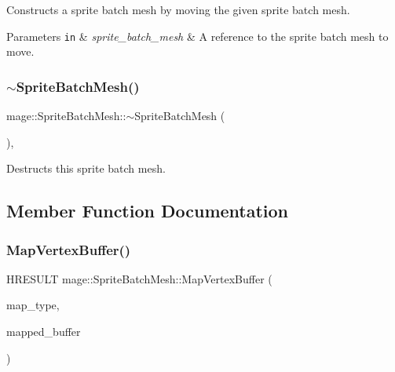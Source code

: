 Constructs a sprite batch mesh by moving the given sprite batch mesh.


\begin{DoxyParams}[1]{Parameters}
\mbox{\tt in}  & {\em sprite\+\_\+batch\+\_\+mesh} & A reference to the sprite batch mesh to move. \\
\hline
\end{DoxyParams}
\hypertarget{classmage_1_1_sprite_batch_mesh_a4f9ad5d0d58722499b9e7ddfac3312c9}{}\label{classmage_1_1_sprite_batch_mesh_a4f9ad5d0d58722499b9e7ddfac3312c9} 
\subsubsection{\texorpdfstring{$\sim$\+Sprite\+Batch\+Mesh()}{~SpriteBatchMesh()}}
{\footnotesize\ttfamily mage\+::\+Sprite\+Batch\+Mesh\+::$\sim$\+Sprite\+Batch\+Mesh (\begin{DoxyParamCaption}{ }\end{DoxyParamCaption})\hspace{0.3cm}{\ttfamily [virtual]}, {\ttfamily [default]}}

Destructs this sprite batch mesh. 

\subsection{Member Function Documentation}
\hypertarget{classmage_1_1_sprite_batch_mesh_ab790dbbd3cb685c1f14d7ca1e9ed639b}{}\label{classmage_1_1_sprite_batch_mesh_ab790dbbd3cb685c1f14d7ca1e9ed639b} 
\subsubsection{\texorpdfstring{Map\+Vertex\+Buffer()}{MapVertexBuffer()}}
{\footnotesize\ttfamily H\+R\+E\+S\+U\+LT mage\+::\+Sprite\+Batch\+Mesh\+::\+Map\+Vertex\+Buffer (\begin{DoxyParamCaption}\item[{D3\+D11\+\_\+\+M\+AP}]{map\+\_\+type,  }\item[{D3\+D11\+\_\+\+M\+A\+P\+P\+E\+D\+\_\+\+S\+U\+B\+R\+E\+S\+O\+U\+R\+CE $\ast$}]{mapped\+\_\+buffer }\end{DoxyParamCaption})}

